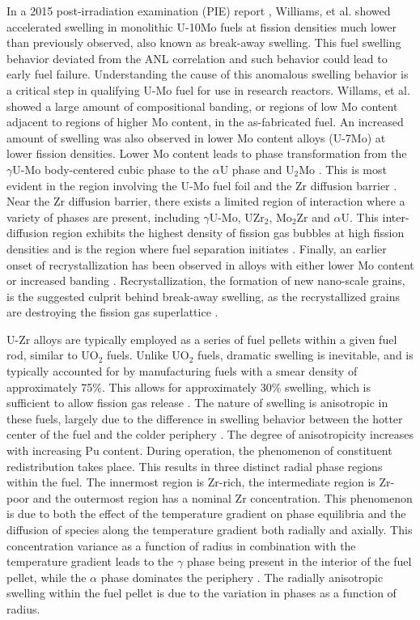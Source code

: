\documentclass[review]{elsarticle}
\begin{document}
In a 2015 post-irradiation examination (PIE) report \cite{afip6report}, Williams, et al. showed accelerated swelling in monolithic U-10Mo fuels at fission densities much lower than previously observed, also known as break-away swelling. This fuel swelling behavior deviated from the ANL correlation and such behavior could lead to early fuel failure. Understanding the cause of this anomalous swelling behavior is a critical step in qualifying U-Mo fuel for use in research reactors. Willams, et al. \cite{afip6report} showed a large amount of compositional banding, or regions of low Mo content adjacent to regions of higher Mo content, in the as-fabricated fuel. An increased amount of swelling was also observed in lower Mo content alloys (U-7Mo) \cite{vandenberghe2014} at lower fission densities. Lower Mo content leads to phase transformation from the $\gamma$U-Mo body-centered cubic phase to the $\alpha$U phase and U$_{2}$Mo \cite{janfong2014}. This is most evident in the region involving the U-Mo fuel foil and the Zr diffusion barrier \cite{park2015}. Near the Zr diffusion barrier, there exists a limited region of interaction where a variety of phases are present, including $\gamma$U-Mo, UZr$_{2}$, Mo$_{2}$Zr and $\alpha$U. This inter-diffusion region exhibits the highest density of fission gas bubbles at high fission densities and is the region where fuel separation initiates \cite{rertr12}. Finally, an earlier onset of recrystallization has been observed in alloys with either lower Mo content or increased banding \cite{kim2013A}. Recrystallization, the formation of new nano-scale grains, is the suggested culprit behind break-away swelling, as the recrystallized grains are destroying the fission gas superlattice \cite{vandenberghe2008}. 

U-Zr alloys are typically employed as a series of fuel pellets within a given fuel rod, similar to UO$_{2}$ fuels. Unlike UO$_{2}$ fuels, dramatic swelling is inevitable, and is typically accounted for by manufacturing fuels with a smear density of approximately 75{\%}. This allows for approximately 30\% swelling, which is sufficient to allow fission gas release \cite{beck1968}. The nature of swelling is anisotropic in these fuels, largely due to the difference in swelling behavior between the hotter center of the fuel and the colder periphery \cite{hofman1990}. The degree of anisotropicity increases with increasing Pu content. During operation, the phenomenon of constituent redistribution takes place. This results in three distinct radial phase regions within the fuel. The innermost region is Zr-rich, the intermediate region is Zr-poor and the outermost region has a nominal Zr concentration. This phenomenon is due to both the effect of the temperature gradient on phase equilibria and the diffusion of species along the temperature gradient both radially and axially. This concentration variance as a function of radius in combination with the temperature gradient leads to the $\gamma$ phase being present in the interior of the fuel pellet, while the $\alpha$ phase dominates the periphery \cite{kobayashi1990, kim2004}. The radially anisotropic swelling within the fuel pellet is due to the variation in phases as a function of radius.
\end{document}
